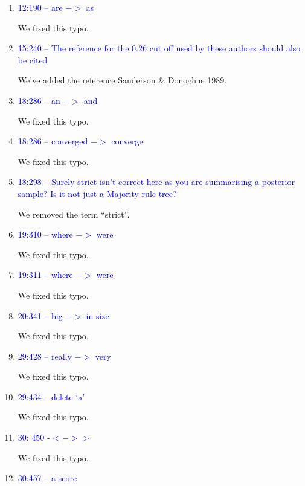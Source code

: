 \documentclass[12pt,letterpaper]{article}
\begin{document}
\begin{enumerate}

\item{\textcolor{blue}{12:190 – are $->$ as}}

We fixed this typo.

\item{\textcolor{blue}{15:240 – The reference for the 0.26 cut off used by these authors should also be cited}}

We've added the reference Sanderson \& Donoghue 1989.

\item{\textcolor{blue}{18:286 – an $->$ and}}

We fixed this typo.

\item{\textcolor{blue}{18:286 – converged $->$ converge}}

We fixed this typo.

\item{\textcolor{blue}{18:298 – Surely strict isn't correct here as you are summarising a posterior sample? Is it not just a Majority rule tree?}}

We removed the term ``strict''.

\item{\textcolor{blue}{19:310 – where $->$ were}}

We fixed this typo.

\item{\textcolor{blue}{19:311 – where $->$ were}}

We fixed this typo.

\item{\textcolor{blue}{20:341 – big $->$ in size}}

We fixed this typo.

\item{\textcolor{blue}{29:428 – really $->$ very}}

We fixed this typo.

\item{\textcolor{blue}{29:434 – delete ‘a'}}

We fixed this typo.

\item{\textcolor{blue}{30: 450 - < $->$ >}}

We fixed this typo.

\item{\textcolor{blue}{30:457 – a score}}


\end{enumerate}
\end{document}
